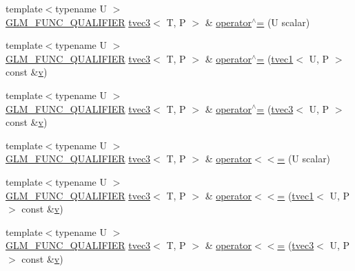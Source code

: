 \begin{DoxyCompactItemize}
\item 
{\footnotesize template$<$typename U $>$ }\\\mbox{\hyperlink{setup_8hpp_a33fdea6f91c5f834105f7415e2a64407}{G\+L\+M\+\_\+\+F\+U\+N\+C\+\_\+\+Q\+U\+A\+L\+I\+F\+I\+ER}} \mbox{\hyperlink{structglm_1_1tvec3}{tvec3}}$<$ T, P $>$ \& \mbox{\hyperlink{structglm_1_1tvec3_a2cde30e231cec7c356125b3fa4b7fe31}{operator$^\wedge$=}} (U scalar)
\item 
{\footnotesize template$<$typename U $>$ }\\\mbox{\hyperlink{setup_8hpp_a33fdea6f91c5f834105f7415e2a64407}{G\+L\+M\+\_\+\+F\+U\+N\+C\+\_\+\+Q\+U\+A\+L\+I\+F\+I\+ER}} \mbox{\hyperlink{structglm_1_1tvec3}{tvec3}}$<$ T, P $>$ \& \mbox{\hyperlink{structglm_1_1tvec3_a03040ddfeb97c166a0f6e4888f4f75fe}{operator$^\wedge$=}} (\mbox{\hyperlink{structglm_1_1tvec1}{tvec1}}$<$ U, P $>$ const \&\mbox{\hyperlink{glad_8h_a14cfbe2fc2234f5504618905b69d1e06}{v}})
\item 
{\footnotesize template$<$typename U $>$ }\\\mbox{\hyperlink{setup_8hpp_a33fdea6f91c5f834105f7415e2a64407}{G\+L\+M\+\_\+\+F\+U\+N\+C\+\_\+\+Q\+U\+A\+L\+I\+F\+I\+ER}} \mbox{\hyperlink{structglm_1_1tvec3}{tvec3}}$<$ T, P $>$ \& \mbox{\hyperlink{structglm_1_1tvec3_aaf5a7e57c8fe6292695624a42b69c339}{operator$^\wedge$=}} (\mbox{\hyperlink{structglm_1_1tvec3}{tvec3}}$<$ U, P $>$ const \&\mbox{\hyperlink{glad_8h_a14cfbe2fc2234f5504618905b69d1e06}{v}})
\item 
{\footnotesize template$<$typename U $>$ }\\\mbox{\hyperlink{setup_8hpp_a33fdea6f91c5f834105f7415e2a64407}{G\+L\+M\+\_\+\+F\+U\+N\+C\+\_\+\+Q\+U\+A\+L\+I\+F\+I\+ER}} \mbox{\hyperlink{structglm_1_1tvec3}{tvec3}}$<$ T, P $>$ \& \mbox{\hyperlink{structglm_1_1tvec3_adf4b78d96e7c46c98751a39d26d6822d}{operator$<$$<$=}} (U scalar)
\item 
{\footnotesize template$<$typename U $>$ }\\\mbox{\hyperlink{setup_8hpp_a33fdea6f91c5f834105f7415e2a64407}{G\+L\+M\+\_\+\+F\+U\+N\+C\+\_\+\+Q\+U\+A\+L\+I\+F\+I\+ER}} \mbox{\hyperlink{structglm_1_1tvec3}{tvec3}}$<$ T, P $>$ \& \mbox{\hyperlink{structglm_1_1tvec3_a3eadadf25a3ef2e34bb1b6b7f192384a}{operator$<$$<$=}} (\mbox{\hyperlink{structglm_1_1tvec1}{tvec1}}$<$ U, P $>$ const \&\mbox{\hyperlink{glad_8h_a14cfbe2fc2234f5504618905b69d1e06}{v}})
\item 
{\footnotesize template$<$typename U $>$ }\\\mbox{\hyperlink{setup_8hpp_a33fdea6f91c5f834105f7415e2a64407}{G\+L\+M\+\_\+\+F\+U\+N\+C\+\_\+\+Q\+U\+A\+L\+I\+F\+I\+ER}} \mbox{\hyperlink{structglm_1_1tvec3}{tvec3}}$<$ T, P $>$ \& \mbox{\hyperlink{structglm_1_1tvec3_a7c12511c3769c0e7822bc884af40f3a2}{operator$<$$<$=}} (\mbox{\hyperlink{structglm_1_1tvec3}{tvec3}}$<$ U, P $>$ const \&\mbox{\hyperlink{glad_8h_a14cfbe2fc2234f5504618905b69d1e06}{v}})

\end{DoxyCompactItemize}

